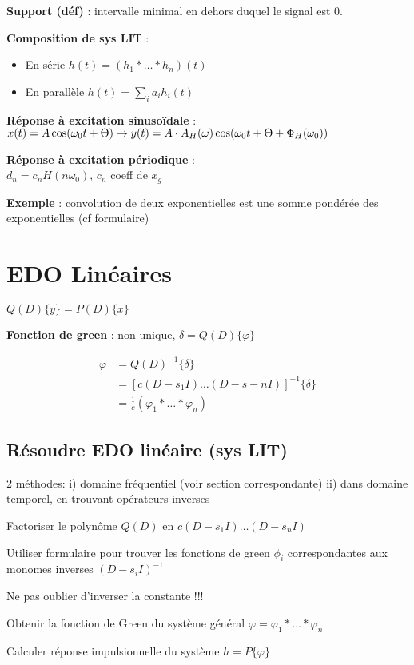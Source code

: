 \textbf{Support (déf)} : intervalle minimal en dehors duquel le signal est 0.

\textbf{Composition de sys LIT} : 
\begin{itemize}
    \item En série $h(t) = (h_1 * \dots * h_n)(t)$
    \item En parallèle $h(t) = \sum_i a_i h_i(t)$
\end{itemize}

\textbf{Réponse à excitation sinusoïdale} : \\
$x(t) = A \cos(\omega_0 t + \Theta)  \\
\rightarrow y(t) = A \cdot A_H(\omega) \cos(\omega_0 t + \Theta + \Phi_H(\omega_0))$

\textbf{Réponse à excitation périodique} : \\
$d_n = c_n H(n\omega_0)$, $c_n$ coeff de $x_g$ %

\textbf{Exemple} : convolution de deux exponentielles est une somme pondérée des exponentielles (cf formulaire)



\section{EDO Linéaires}

$
    Q(D)\{y\} = P(D)\{x\}
$

\textbf{Fonction de green} : non unique, $\delta = Q(D)\{\varphi\}$ 

\begin{align*}
    \varphi & = Q(D)^{-1} \{\delta\} \\
         & = \left[ c(D-s_1I)\dots(D-s-nI) \right]^{-1}\{\delta\} \\
         & = \frac{1}{c}(\varphi_1 * \dots * \varphi_n)
\end{align*}

\subsection*{Résoudre EDO linéaire (sys LIT)}

2 méthodes: i) domaine fréquentiel (voir section correspondante) ii) dans domaine temporel, en trouvant opérateurs inverses

\begin{enum}
    \item Factoriser le polynôme $Q(D)$ en $c(D-s_1I)\dots(D-s_nI)$
    \item Utiliser formulaire pour trouver les fonctions de green $\phi_i$ correspondantes aux monomes inverses $(D-s_iI)^{-1}$
    \item Ne pas oublier d'inverser la constante !!!
    \item Obtenir la fonction de Green du système général $\varphi = \varphi_1 * \dots * \varphi_n$
    \item Calculer réponse impulsionnelle du système $h = P\{\varphi\}$
\end{enum}

